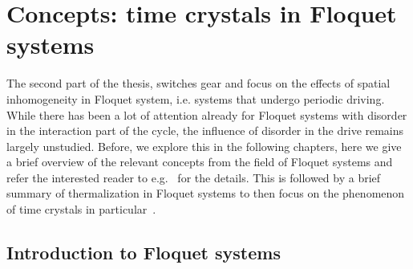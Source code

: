 \chapter{Concepts: time crystals in Floquet systems}\label{ch:introduction-floquet}

The second part of the thesis, switches gear and focus on the effects of spatial inhomogeneity in Floquet system, i.e. systems that undergo periodic driving. While there has been a lot of attention already for Floquet systems with disorder in the interaction part of the cycle, the influence of disorder in the drive remains largely unstudied. Before, we explore this in the following chapters, here we give a brief overview of the relevant concepts from the field of Floquet systems and refer the interested reader to e.g.~\cite{eckardtColloquiumAtomicQuantum2017} for the details. This is followed by a brief summary of thermalization in Floquet systems to then focus on the phenomenon of time crystals in particular~\cite{elseFloquetTimeCrystals2016,khemaniBriefHistoryTime2019,elseDiscreteTimeCrystals2020a}.



\section{Introduction to Floquet systems}

